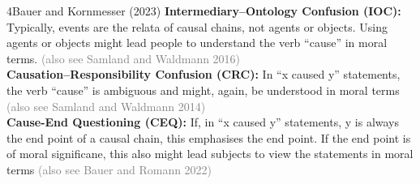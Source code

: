 \documentclass[xcolor=table,9pt,aspectratio=169]{beamer}
\begin{document}
\begin{frame}{\vspace*{10mm}4\hspace*{1em}Bauer and Kornmesser (2023)}
\vspace*{-5mm}
\textbf{Intermediary--Ontology Confusion (IOC):} Typically, events are the relata of causal chains, not agents or objects. Using agents or objects might lead people to understand the verb ``cause'' in moral terms. \textcolor{gray}{(also see Samland and Waldmann 2016)}\\
\vspace*{1em}
\textbf{Causation--Responsibility Confusion (CRC):} In ``x caused y'' statements, the verb ``cause'' is ambiguous and might, again, be understood in moral terms \textcolor{gray}{(also see Samland and Waldmann 2014)}\\
\vspace*{1em}
\textbf{Cause-End Questioning (CEQ):} If, in ``x caused y'' statements, y is always the end point of a causal chain, this emphasises the end point. If the end point is of moral significane, this also might lead subjects to view the statements in moral terms \textcolor{gray}{(also see Bauer and Romann 2022)}\\
\end{frame}
\end{document}
